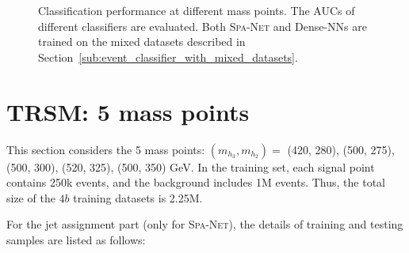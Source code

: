 \documentclass[12pt]{article}
\begin{document}
        \begin{figure}[htpb]
            \centering
            \caption{Classification performance at different mass points. The AUCs of different classifiers are evaluated. Both \textsc{Spa-Net} and Dense-NNs are trained on the mixed datasets described in Section~\ref{sub:event_classifier_with_mixed_datasets}.}  
            \label{fig:classification_performance_each_mass_point-TRSM}  
        \end{figure}
\section{TRSM: 5 mass points}%
\label{sec:trsm_5_mass_points}
    This section considers the 5 mass points: $(m_{h_3}, m_{h_2}) = $ (420, 280), (500, 275), (500, 300), (520, 325), (500, 350) GeV. In the training set, each signal point contains 250k events, and the background includes 1M events. Thus, the total size of the $4b$ training datasets is 2.25M.

    For the jet assignment part (only for \textsc{Spa-Net}), the details of training and testing samples are listed as follows:
\end{document}
